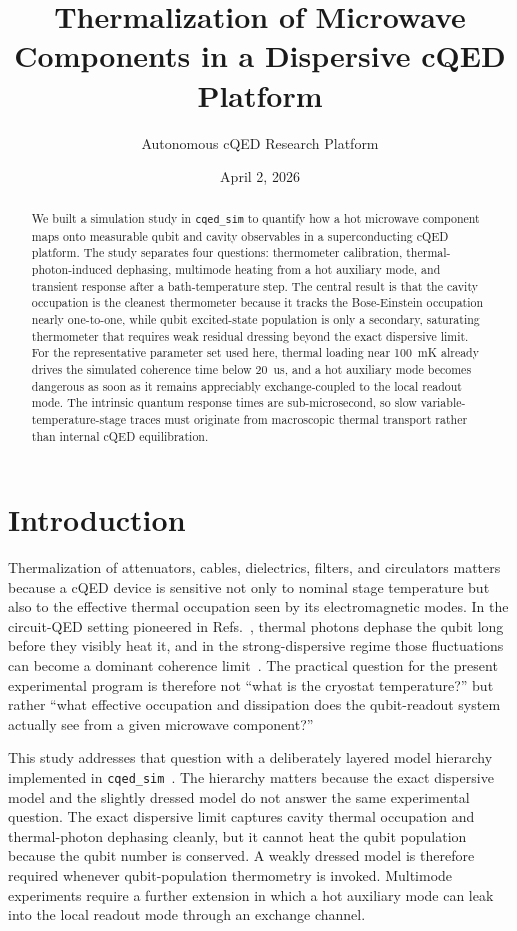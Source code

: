 \documentclass[11pt]{article}
\title{Thermalization of Microwave Components in a Dispersive cQED Platform}
\author{Autonomous cQED Research Platform}
\date{April 2, 2026}
\begin{document}
\maketitle

\begin{abstract}
We built a simulation study in \texttt{cqed\_sim} to quantify how a hot microwave component maps onto measurable qubit and cavity observables in a superconducting cQED platform. The study separates four questions: thermometer calibration, thermal-photon-induced dephasing, multimode heating from a hot auxiliary mode, and transient response after a bath-temperature step. The central result is that the cavity occupation is the cleanest thermometer because it tracks the Bose-Einstein occupation nearly one-to-one, while qubit excited-state population is only a secondary, saturating thermometer that requires weak residual dressing beyond the exact dispersive limit. For the representative parameter set used here, thermal loading near \SI{100}{mK} already drives the simulated coherence time below \SI{20}{us}, and a hot auxiliary mode becomes dangerous as soon as it remains appreciably exchange-coupled to the local readout mode. The intrinsic quantum response times are sub-microsecond, so slow variable-temperature-stage traces must originate from macroscopic thermal transport rather than internal cQED equilibration.
\end{abstract}

\section{Introduction}
Thermalization of attenuators, cables, dielectrics, filters, and circulators matters because a cQED device is sensitive not only to nominal stage temperature but also to the effective thermal occupation seen by its electromagnetic modes. In the circuit-QED setting pioneered in Refs.~\cite{blais2004cavity,koch2007transmon}, thermal photons dephase the qubit long before they visibly heat it, and in the strong-dispersive regime those fluctuations can become a dominant coherence limit~\cite{sears2012photon}. The practical question for the present experimental program is therefore not ``what is the cryostat temperature?'' but rather ``what effective occupation and dissipation does the qubit-readout system actually see from a given microwave component?''

This study addresses that question with a deliberately layered model hierarchy implemented in \texttt{cqed\_sim}~\cite{cqed_sim}. The hierarchy matters because the exact dispersive model and the slightly dressed model do not answer the same experimental question. The exact dispersive limit captures cavity thermal occupation and thermal-photon dephasing cleanly, but it cannot heat the qubit population because the qubit number is conserved. A weakly dressed model is therefore required whenever qubit-population thermometry is invoked. Multimode experiments require a further extension in which a hot auxiliary mode can leak into the local readout mode through an exchange channel.
\end{document}
